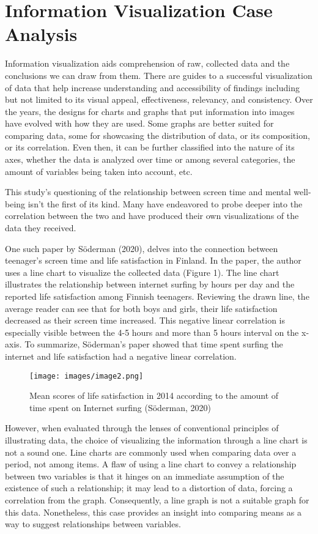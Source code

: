 \documentclass[12pt, a4paper]{article}
\begin{document}
\section{Information Visualization Case Analysis}

\par Information visualization aids comprehension of raw, collected data and the conclusions we can draw from them. There are guides to a successful visualization of data that help increase understanding and accessibility of findings including but not limited to its visual appeal, effectiveness, relevancy, and consistency. Over the years, the designs for charts and graphs that put information into images have evolved with how they are used. Some graphs are better suited for comparing data, some for showcasing the distribution of data, or its composition, or its correlation. Even then, it can be further classified into the nature of its axes, whether the data is analyzed over time or among several categories, the amount of variables being taken into account, etc.
\par This study’s questioning of the relationship between screen time and mental well-being isn’t the first of its kind. Many have endeavored to probe deeper into the correlation between the two and have produced their own visualizations of the data they received.
\par One such paper by Söderman (2020), delves into the connection between teenager’s screen time and life satisfaction in Finland. In the paper, the author uses a line chart to visualize the collected data (Figure 1). The line chart illustrates the relationship between internet surfing by hours per day and the reported life satisfaction among Finnish teenagers. Reviewing the drawn line, the average reader can see that for both boys and girls, their life satisfaction decreased as their screen time increased. This negative linear correlation is especially visible between the 4-5 hours and more than 5 hours interval on the x-axis. To summarize, Söderman’s paper showed that time spent surfing the internet and life satisfaction had a negative linear correlation.
\begin{figure}[h]
    \centering
    \texttt{[image: images/image2.png]}
    \caption{Mean scores of life satisfaction in 2014 according to the amount of time spent on Internet surfing (Söderman, 2020)}
    \label{fig:line_chart}
\end{figure}
\par However, when evaluated through the lenses of conventional principles of illustrating data, the choice of visualizing the information through a line chart is not a sound one. Line charts are commonly used when comparing data over a period, not among items. A flaw of using a line chart to convey a relationship between two variables is that it hinges on an immediate assumption of the existence of such a relationship; it may lead to a distortion of data, forcing a correlation from the graph. Consequently, a line graph is not a suitable graph for this data. Nonetheless, this case provides an insight into comparing means as a way to suggest relationships between variables.
\end{document}

